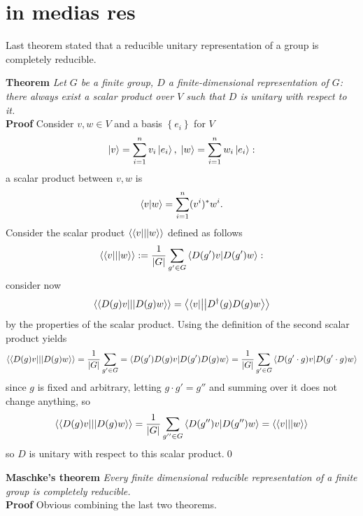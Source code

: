 
\section{in medias res}
Last theorem stated that a reducible unitary representation of a group
is completely reducible.

\textbf{Theorem} \textit{Let $G$ be a finite group, $D$ a finite-dimensional
representation of $G$: there always exist a scalar product over $V$ such that
$D$ is unitary with respect to it.}\\
\textbf{Proof} Consider $v,w\in V$ and a basis $\left\{e_i\right\}$ for $V$
$$\ket{v}= \sum_{i=1}^{n}v_i\ket{e_i},\;\ket{w}= \sum_{i=1}^{n}w_i\ket{e_i}:$$
a scalar product between $v,w$ is
$$\bra{v}\ket{w} = \sum_{i=1}^{n}(v^i)^*w^i.$$
Consider the scalar product $\bra{\bra{v}}\ket{\ket{w}}$ defined as follows
$$\bra{\bra{v}}\ket{\ket{w}}:= \frac{1}{|G|}\sum_{g'\in G}
\bra{D(g')v}\ket{D(g')w}:$$
consider now
$$\bra{\bra{D(g)v}}\ket{\ket{D(g)w}} = 
\bra{\bra{v}}\ket{\ket{D^\dagger(g)D(g)w}}$$
by the properties of the scalar product. Using the definition of the second
scalar product yields
$$
\bra{\bra{D(g)v}}\ket{\ket{D(g)w}}=\frac{1}{|G|}\sum_{g'\in G} =
\bra{D(g')D(g)v}\ket{D(g')D(g)w}=
\frac{1}{|G|}\sum_{g'\in G} \bra{D(g'\cdot g)v}\ket{D(g'\cdot g)w}$$
since $g$ is fixed and arbitrary, letting $g\cdot g' = g''$ and summing over
it does not change anything, so
$$\bra{\bra{D(g)v}}\ket{\ket{D(g)w}}=\frac{1}{|G|}\sum_{g''\in G}\bra{D(g'')v}
\ket{D(g'')w} = \bra{\bra{v}}\ket{\ket{w}}$$
so $D$ is unitary with respect to this scalar product.\qed

\textbf{Maschke's theorem} \textit{Every finite dimensional reducible 
representation of a finite group is completely reducible.}\\
\textbf{Proof} Obvious combining the last two theorems.

